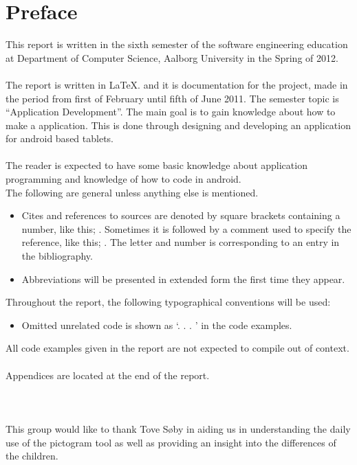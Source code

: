 \chapter*{Preface}
This report is written in the sixth semester of the software engineering education at Department of Computer Science, Aalborg University in the Spring of 2012.  \\
\\
The report is written in \LaTeX. and it is documentation for the project, made in the period from first of February until fifth of June 2011.
The semester topic is ``Application Development''. The main goal is to gain knowledge about how to make a application. This is done through designing and developing an application for android based tablets.\\
\\
The reader is expected to have some basic knowledge about application programming and knowledge of how to code in android. \\
The following are general unless anything else is mentioned.

\begin{itemize}
\item Cites and references to sources are denoted by square brackets containing a number,  like this; \cite{XP}. Sometimes it is followed by a comment used to specify the reference, like this; \cite[Comment]{XP}. The letter and number is corresponding to an entry in the bibliography. 
\item Abbreviations will be presented in extended form the first time they appear. 
\end{itemize}

Throughout the report, the following typographical conventions will be used:
 
\begin{itemize}
\item Omitted unrelated code is shown as `. . . ’ in the code examples.
\end{itemize}

All code examples given in the report are not expected to compile out of context.\\
\\
Appendices are located at the end of the report. \\ \\  \\ \\

This group would like to thank Tove S\o{}by in aiding us in understanding the daily use of the pictogram tool as well as providing an insight into the differences of the children.  

